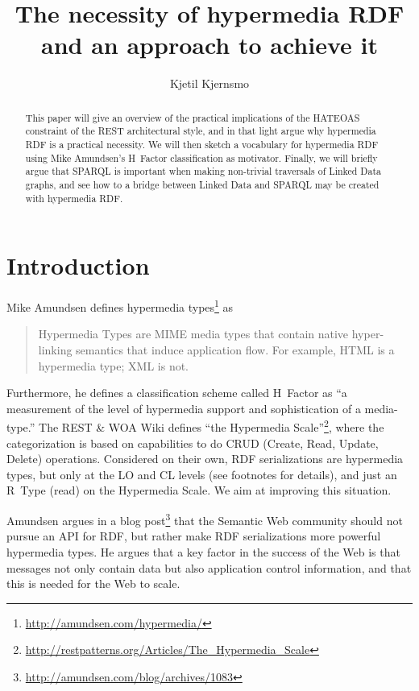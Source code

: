 \documentclass{llncs}
\title{The necessity of hypermedia RDF and an approach to achieve it}
\author{Kjetil Kjernsmo\inst{1}}
\institute{Department of Informatics,
Postboks 1080 Blindern,
0316 Oslo, Norway
\email{kjekje@ifi.uio.no}}
\begin{document}
\maketitle



\begin{abstract}
This paper will give an overview of the practical implications of the
HATEOAS constraint of the REST architectural style, and in that light argue why
hypermedia RDF is a practical necessity. We will then sketch a
vocabulary for hypermedia RDF using Mike Amundsen's H~Factor
classification as motivator. Finally, we will briefly argue that
SPARQL is important when making non-trivial traversals of Linked Data
graphs, and see how to a bridge between Linked Data and SPARQL may be
created with hypermedia RDF.
\end{abstract}

\section{Introduction}

Mike Amundsen defines hypermedia types\footnote{\url{http://amundsen.com/hypermedia/}} as 
\begin{quote}
Hypermedia Types are MIME media types that contain native
hyper-linking semantics that induce application flow. For example,
HTML is a hypermedia type; XML is not.
\end{quote}
Furthermore, he defines a classification scheme called H~Factor as ``a
measurement of the level of hypermedia support and sophistication of a
media-type.'' The REST \& WOA Wiki defines ``the Hypermedia
Scale''\footnote{\url{http://restpatterns.org/Articles/The\_Hypermedia\_Scale}},
where the categorization is based on capabilities to do CRUD (Create,
Read, Update, Delete) operations.  Considered on their own, RDF
serializations are hypermedia types, but only at the \textsf{LO} and
\textsf{CL} levels (see footnotes for details), and just an R~Type
(read) on the Hypermedia Scale. We aim at improving this situation.

Amundsen argues in a blog
post\footnote{\url{http://amundsen.com/blog/archives/1083}} that the
Semantic Web community should not pursue an API for RDF, but rather
make RDF serializations more powerful hypermedia types. He argues that
a key factor in the success of the Web is that messages not only
contain data but also application control information, and that this is
needed for the Web to scale.
\end{document}
